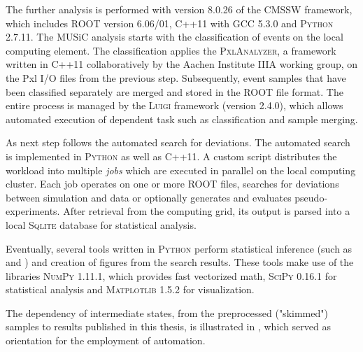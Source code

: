 The further analysis is performed with version 8.0.26 of the \textsc{CMSSW} framework, which includes \textsc{ROOT} version 6.06/01\cite{Brun:ROOTobjectoriented}, C++11 with \textsc{GCC} 5.3.0 and \textsc{Python} 2.7.11\cite{Oliphant:PythonScientificComputing}.
The \ac{MUSiC} analysis starts with the classification of events on the local computing element. The classification applies the \textsc{PxlAnalyzer}, a framework written in C++11 collaboratively by the Aachen Institute IIIA working group, on the Pxl I/O files from the previous step. Subsequently, event samples that have been classified separately are merged and stored in the \textsc{ROOT} file format. The entire process is managed by the \textsc{Luigi} framework \cite{Spotify:Luigi}(version 2.4.0), which allows automated execution of dependent task such as classification and sample merging.

As next step follows the automated search for deviations. The automated search is implemented in \textsc{Python} as well as C++11. A custom script distributes the workload into multiple \emph{jobs} which are executed in parallel on the local computing cluster. Each job operates on one or more \textsc{ROOT} files, searches for deviations between simulation and data or optionally generates and evaluates pseudo-experiments.
After retrieval from the computing grid, its output is parsed into a local \textsc{Sqlite} database for statistical analysis.

Eventually, several tools written in \textsc{Python} perform statistical inference (such as \ptilde and \phat) and creation of figures from the search results. These tools make use of the libraries \textsc{NumPy} 1.11.1\cite{Walt:NumPyarraystructure}, which provides fast vectorized math, \textsc{SciPy} 0.16.1\cite{Jones:SciPyOpensource} for statistical analysis and \textsc{Matplotlib} 1.5.2\cite{Hunter:Matplotlib2Dgraphics} for visualization.

The dependency of intermediate states, from the preprocessed ("skimmed") samples to results published in this thesis, is illustrated in , which served as orientation for the employment of automation.

